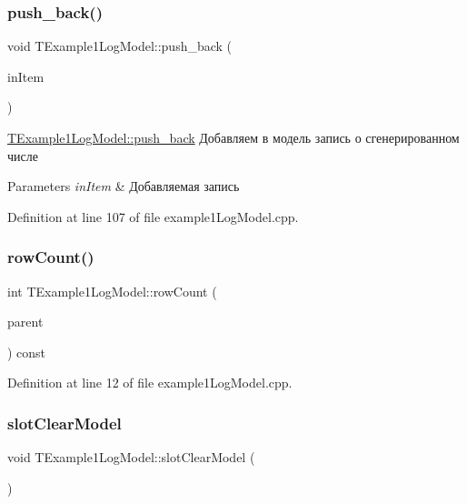 \subsubsection{\texorpdfstring{push\+\_\+back()}{push\_back()}}
{\footnotesize\ttfamily void T\+Example1\+Log\+Model\+::push\+\_\+back (\begin{DoxyParamCaption}\item[{const \hyperlink{structexample_define_1_1example1_log_data}{example\+Define\+::example1\+Log\+Data}}]{in\+Item }\end{DoxyParamCaption})}



\hyperlink{class_t_example1_log_model_ac65587677b307f28f624491de852177a}{T\+Example1\+Log\+Model\+::push\+\_\+back} Добавляем в модель запись о сгенерированном числе 


\begin{DoxyParams}{Parameters}
{\em in\+Item} & Добавляемая запись \\
\hline
\end{DoxyParams}


Definition at line 107 of file example1\+Log\+Model.\+cpp.

\mbox{\label{class_t_example1_log_model_a878b1dde0fbca43a40dbec1ea5e3109c}} 
\subsubsection{\texorpdfstring{row\+Count()}{rowCount()}}
{\footnotesize\ttfamily int T\+Example1\+Log\+Model\+::row\+Count (\begin{DoxyParamCaption}\item[{const Q\+Model\+Index \&}]{parent }\end{DoxyParamCaption}) const}



Definition at line 12 of file example1\+Log\+Model.\+cpp.

\mbox{\label{class_t_example1_log_model_ad94610473fbd8834e350061f60e92f95}} 
\subsubsection{\texorpdfstring{slot\+Clear\+Model}{slotClearModel}}
{\footnotesize\ttfamily void T\+Example1\+Log\+Model\+::slot\+Clear\+Model (\begin{DoxyParamCaption}{ }\end{DoxyParamCaption})\hspace{0.3cm}{\ttfamily [slot]}}



